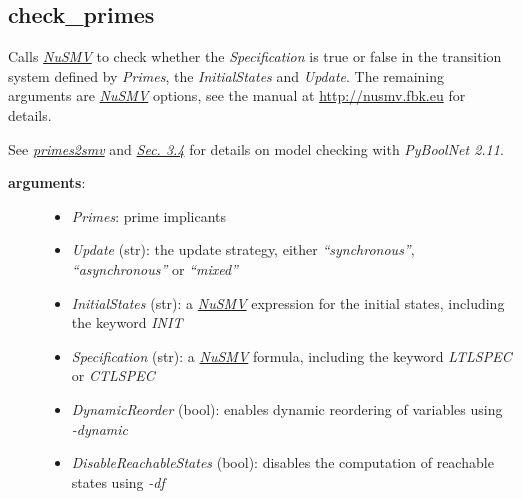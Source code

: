 \documentclass[letterpaper,10pt,english]{sphinxmanual}
\begin{document}
\subsection{check\_primes}
\label{ModelChecking:id2}\label{ModelChecking:check-primes}

\begin{fulllineitems}
\label{ModelChecking:PyBoolNet.ModelChecking.check_primes}
Calls {\hyperref[Installation:installation-nusmv]{\emph{NuSMV}}} to check whether the \emph{Specification} is true or false in the transition system defined by \emph{Primes},
the \emph{InitialStates} and \emph{Update}.
The remaining arguments are {\hyperref[Installation:installation-nusmv]{\emph{NuSMV}}} options, see the manual at \href{http://nusmv.fbk.eu}{http://nusmv.fbk.eu} for details.

See {\hyperref[ModelChecking:primes2smv]{\emph{primes2smv}}} and {\hyperref[Manual:sec-model-checking]{\emph{Sec. 3.4}}} for details on model checking with \emph{PyBoolNet 2.11}.
\begin{description}
\item[{\textbf{arguments}:}] \leavevmode\begin{itemize}
\item {} 
\emph{Primes}: prime implicants

\item {} 
\emph{Update} (str): the update strategy, either \emph{``synchronous''}, \emph{``asynchronous''} or \emph{``mixed''}

\item {} 
\emph{InitialStates} (str): a {\hyperref[Installation:installation-nusmv]{\emph{NuSMV}}} expression for the initial states, including the keyword \emph{INIT}

\item {} 
\emph{Specification} (str): a {\hyperref[Installation:installation-nusmv]{\emph{NuSMV}}} formula, including the keyword \emph{LTLSPEC} or \emph{CTLSPEC}

\item {} 
\emph{DynamicReorder} (bool): enables dynamic reordering of variables using \emph{-dynamic}

\item {} 
\emph{DisableReachableStates} (bool): disables the computation of reachable states using \emph{-df}


\end{itemize}
\end{description}
\end{fulllineitems}
\end{document}
